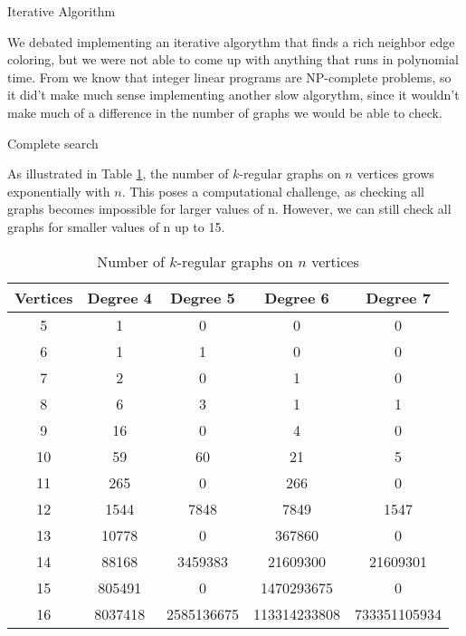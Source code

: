 \documentclass[12pt,a4paper]{amsart}
\makeatletter
\renewcommand\section{\@startsection{section}{1}
  \z@{.5\linespacing\@plus.7\linespacing}{.5\linespacing}
  {\normalfont\scshape\large\centering}}
\renewcommand\subsection{\@startsection{subsection}{2}
  \z@{.5\linespacing\@plus.7\linespacing}{.5\linespacing}
  {\normalfont\scshape}}
\theoremstyle{definition} %
\theoremstyle{plain} %
\makeatother
\begin{document}
    \subsection{Iterative Algorithm}
            
        We debated implementing an iterative algorythm that finds a rich neighbor edge coloring, but we were not able to come up with anything that runs in polynomial time. From \cite{10.1007/978-3-642-95322-4_17} we know that integer linear programs are NP-complete problems, so it did't make much sense implementing another slow algorythm, since it wouldn't make much of a difference in the number of graphs we would be able to check.


\section{Complete search}

    As illustrated in Table \ref{table:1}, the number of $k$-regular graphs on $n$ vertices grows exponentially with $n$. This poses a computational challenge, as checking all graphs becomes impossible for larger values of n. However, we can still check all graphs for smaller values of n up to 15.

    \begin{table}[!htbp]
        \centering
        \begin{tabular}{|c|c|c|c|c|}
            \hline
            Vertices & Degree 4 & Degree 5 & Degree 6 & Degree 7 \\
            \hline
            5 & 1 & 0 & 0 & 0 \\
            6 & 1 & 1 & 0 & 0 \\
            7 & 2 & 0 & 1 & 0 \\
            8 & 6 & 3 & 1 & 1 \\
            9 & 16 & 0 & 4 & 0 \\
            10 & 59 & 60 & 21 & 5 \\
            11 & 265 & 0 & 266 & 0 \\
            12 & 1544 & 7848 & 7849 & 1547 \\
            13 & 10778 & 0 & 367860 & 0 \\
            14 & 88168 & 3459383 & 21609300 & 21609301 \\
            15 & 805491 & 0 & 1470293675 & 0 \\
            16 & 8037418 & 2585136675 & 113314233808 & 733351105934 \\
            \hline
        \end{tabular}
        \caption{Number of $k$-regular graphs on $n$ vertices \cite{meringer1999fast}
        }
        \label{table:1}
    \end{table}
\end{document}
